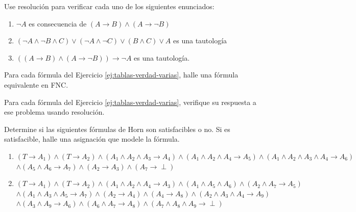\documentclass[12pt,a4paper]{book}
\begin{document}
    \begin{ejercicio}
        Use resolución para verificar cada uno de los siguientes enunciados:
        \begin{enumerate}[label=(\alph*)]
            \item $\neg A$ es consecuencia de $(A\rightarrow B)\wedge(A\rightarrow\neg B)$
            \item $(\neg A\wedge\neg B\wedge C)\vee(\neg A\wedge\neg C)\vee(B\wedge C)\vee A$ es una tautología
            \item $((A\rightarrow B)\wedge(A\rightarrow\neg B))\rightarrow\neg A$ es una tautología.
        \end{enumerate}
    \end{ejercicio}

    \begin{ejercicio}
        Para cada fórmula del Ejercicio \ref{ej:tablas-verdad-varias}, halle una fórmula equivalente en FNC.
    \end{ejercicio}

    \begin{ejercicio}
        Para cada fórmula del Ejercicio \ref{ej:tablas-verdad-varias}, verifique su respuesta a ese problema usando
        resolución.
    \end{ejercicio}

    \begin{ejercicio}
        Determine si las siguientes fórmulas de Horn son satisfacibles o no. Si es satisfacible, halle una asignación que
        modele la fórmula.
        \begin{enumerate}[label=(\alph*)]
            \item $(T\rightarrow A_{1})\wedge(T\rightarrow A_{2})\wedge(A_{1}\wedge A_{2}\wedge A_{3}\rightarrow A_{4})
            \wedge(A_{1}\wedge A_{2}\wedge A_{4}\rightarrow A_{5})\wedge(A_{1}\wedge A_{2}\wedge A_{3}\wedge A_{4}\rightarrow A_{6})$\\
            $\wedge(A_{5}\wedge A_{6}\rightarrow A_{7})\wedge(A_{2}\rightarrow A_{3})\wedge(A_{7}\rightarrow\perp)$
            \item $(T\rightarrow A_{1})\wedge(T\rightarrow A_{2})\wedge(A_{1}\wedge A_{2}\wedge A_{4}\rightarrow A_{3})
            \wedge(A_{1}\wedge A_{5}\wedge A_{6})\wedge(A_{2}\wedge A_{7}\rightarrow A_{5})$\\
            $\wedge(A_{1}\wedge A_{3}\wedge A_{5}\rightarrow A_{7})\wedge(A_{2}\rightarrow A_{4})\wedge(A_{4}\rightarrow A_{8})
            \wedge(A_{2}\wedge A_{3}\wedge A_{4}\rightarrow A_{9})$\\
            $\wedge(A_{3}\wedge A_{9}\rightarrow A_{6})\wedge(A_{6}\wedge A_{7}\rightarrow A_{8})\wedge(A_{7}\wedge A_{8}\wedge A_{9}\rightarrow\perp)$
        \end{enumerate}
    \end{ejercicio}
\end{document}
